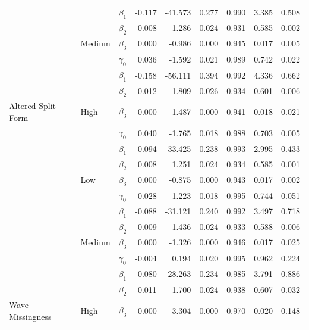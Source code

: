 \documentclass{svjour3}\usepackage[]{graphicx}\usepackage[]{color}
\newenvironment{knitrout}{}{} %
\begin{document}
\begin{knitrout}
\begin{tabular}{l|l|l|r|r|r|r|r|r}
\cline{3-9}
 &  & $\beta_1$ & -0.117 & -41.573 & 0.277 & 0.990 & 3.385 & 0.508\\
\cline{3-9}
 &  & $\beta_2$ & 0.008 & 1.286 & 0.024 & 0.931 & 0.585 & 0.002\\
\cline{3-9}
 & \multirow{-4}{*}{\raggedright\arraybackslash Medium} & $\beta_3$ & 0.000 & -0.986 & 0.000 & 0.945 & 0.017 & 0.005\\
\cline{2-9}
 &  & $\gamma_0$ & 0.036 & -1.592 & 0.021 & 0.989 & 0.742 & 0.022\\
\cline{3-9}
 &  & $\beta_1$ & -0.158 & -56.111 & 0.394 & 0.992 & 4.336 & 0.662\\
\cline{3-9}
 &  & $\beta_2$ & 0.012 & 1.809 & 0.026 & 0.934 & 0.601 & 0.006\\
\cline{3-9}
\multirow{-12}{*}{\raggedright\arraybackslash Altered Split Form} & \multirow{-4}{*}{\raggedright\arraybackslash High} & $\beta_3$ & 0.000 & -1.487 & 0.000 & 0.941 & 0.018 & 0.021\\
\cline{1-9}
 &  & $\gamma_0$ & 0.040 & -1.765 & 0.018 & 0.988 & 0.703 & 0.005\\
\cline{3-9}
 &  & $\beta_1$ & -0.094 & -33.425 & 0.238 & 0.993 & 2.995 & 0.433\\
\cline{3-9}
 &  & $\beta_2$ & 0.008 & 1.251 & 0.024 & 0.934 & 0.585 & 0.001\\
\cline{3-9}
 & \multirow{-4}{*}{\raggedright\arraybackslash Low} & $\beta_3$ & 0.000 & -0.875 & 0.000 & 0.943 & 0.017 & 0.002\\
\cline{2-9}
 &  & $\gamma_0$ & 0.028 & -1.223 & 0.018 & 0.995 & 0.744 & 0.051\\
\cline{3-9}
 &  & $\beta_1$ & -0.088 & -31.121 & 0.240 & 0.992 & 3.497 & 0.718\\
\cline{3-9}
 &  & $\beta_2$ & 0.009 & 1.436 & 0.024 & 0.933 & 0.588 & 0.006\\
\cline{3-9}
 & \multirow{-4}{*}{\raggedright\arraybackslash Medium} & $\beta_3$ & 0.000 & -1.326 & 0.000 & 0.946 & 0.017 & 0.025\\
\cline{2-9}
 &  & $\gamma_0$ & -0.004 & 0.194 & 0.020 & 0.995 & 0.962 & 0.224\\
\cline{3-9}
 &  & $\beta_1$ & -0.080 & -28.263 & 0.234 & 0.985 & 3.791 & 0.886\\
\cline{3-9}
 &  & $\beta_2$ & 0.011 & 1.700 & 0.024 & 0.938 & 0.607 & 0.032\\
\cline{3-9}
\multirow{-12}{*}{\raggedright\arraybackslash Wave Missingness} & \multirow{-4}{*}{\raggedright\arraybackslash High} & $\beta_3$ & 0.000 & -3.304 & 0.000 & 0.970 & 0.020 & 0.148\\
\hline
\end{tabular}


\end{knitrout}
\end{document}
